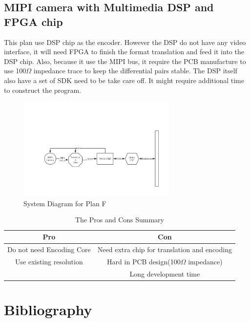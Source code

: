 \documentclass[12pt,article]{memoir}
\begin{document}
\section{MIPI camera with Multimedia DSP and FPGA chip}
This plan use DSP chip as the encoder. However the DSP do not have any video interface, it will need FPGA to finish the format translation and feed it into the DSP chip. Also, because it use the MIPI bus, it require the PCB manufacture to use 100$\Omega$ impedance trace to keep the differential pairs stable. The DSP itself also have a set of SDK need to be take care off. It might require additional time to construct the program.
\begin{figure}[htp]
\begin{center}
\includegraphics[width=0.7\textwidth]{img/DR00002_Plan5-2.png}
 \caption{System Diagram for Plan F}	
\end{center}
\end{figure}
\begin{table}[H]
	\centering
		\begin{tabu}{c | c }
		Pro & Con \\ \hline
		Do not need Encoding Core & Need extra chip for translation and encoding\\
		Use existing resolution & Hard in PCB design(100$\Omega$ impedance) \\
		 & Long development time \\
		\end{tabu}
	\caption{The Pros and Cons Summary}
\end{table}
\newpage
\chapter{Bibliography}
\printbibliography[heading=none]
\end{document}
